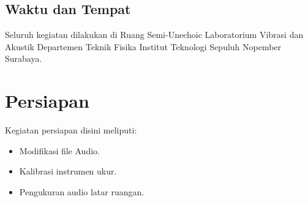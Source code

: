 \documentclass[12pt,]{article}
\begin{document}
	\subsection{Waktu dan Tempat}
	
	Seluruh kegiatan dilakukan di Ruang Semi-Unechoic Laboratorium Vibrasi dan Akustik
	Departemen Teknik Fisika Institut Teknologi Sepuluh Nopember Surabaya.
	
	
	\newpage
	\section{Persiapan}
	
	Kegiatan persiapan disini meliputi:
	\begin{itemize}
		\item Modifikasi file Audio.
		\item Kalibrasi instrumen ukur.
		\item Pengukuran audio latar ruangan.
	\end{itemize}
\end{document}

